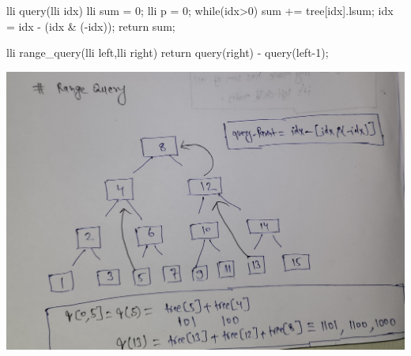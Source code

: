 \begin{fullwidth}
\begin{minipage}[c]{0.5\fullwidthlen}
    \begin{code3}
    lli query(lli idx)
    {
        lli sum = 0;
        lli p = 0;
        while(idx>0)
        {
            sum += tree[idx].lsum;
            idx = idx - (idx & (-idx));        
        } 
        return sum;
    }
    
    lli range_query(lli left,lli right)
    {
        return query(right) - query(left-1);
    }
    \end{code3}
\end{minipage}\hspace{10pt}
\begin{minipage}[c]{0.47\fullwidthlen}
    \includegraphics[width=\textwidth]{resources/dsa-fenwick-range-query.jpg}
\end{minipage}
\end{fullwidth}
